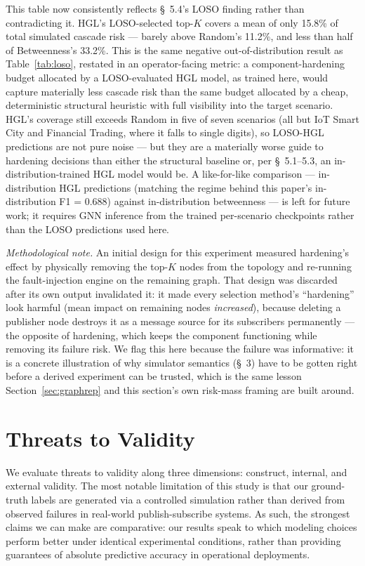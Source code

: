 \documentclass[review]{elsarticle}
\begin{document}
This table now consistently reflects \S~5.4's LOSO finding rather than contradicting it. HGL's
LOSO-selected top-$K$ covers a mean of only 15.8\% of total simulated cascade risk --- barely above
Random's 11.2\%, and less than half of Betweenness's 33.2\%. This is the same negative
out-of-distribution result as Table~\ref{tab:loso}, restated in an operator-facing metric: a
component-hardening budget allocated by a LOSO-evaluated HGL model, as trained here, would capture
materially less cascade risk than the same budget allocated by a cheap, deterministic structural
heuristic with full visibility into the target scenario. HGL's coverage still exceeds Random in
five of seven scenarios (all but IoT Smart City and Financial Trading, where it falls to single
digits), so LOSO-HGL predictions are not pure noise --- but they are a materially worse guide to
hardening decisions than either the structural baseline or, per \S~5.1--5.3, an
in-distribution-trained HGL model would be. A like-for-like comparison --- in-distribution HGL
predictions (matching the regime behind this paper's in-distribution F1 = 0.688) against
in-distribution betweenness --- is left for future work; it requires GNN inference from the trained
per-scenario checkpoints rather than the LOSO predictions used here.

\emph{Methodological note.} An initial design for this experiment measured hardening's effect by
physically removing the top-$K$ nodes from the topology and re-running the fault-injection engine
on the remaining graph. That design was discarded after its own output invalidated it: it made
every selection method's ``hardening'' look harmful (mean impact on remaining nodes
\emph{increased}), because deleting a publisher node destroys it as a message source for its
subscribers permanently --- the opposite of hardening, which keeps the component functioning while
removing its failure risk. We flag this here because the failure was informative: it is a concrete
illustration of why simulator semantics (\S~3) have to be gotten right before a derived experiment
can be trusted, which is the same lesson Section~\ref{sec:graphrep} and this section's own
risk-mass framing are built around.

\section{Threats to Validity}

We evaluate threats to validity along three dimensions: construct, internal, and external
validity. The most notable limitation of this study is that our ground-truth labels are generated
via a controlled simulation rather than derived from observed failures in real-world
publish-subscribe systems. As such, the strongest claims we can make are comparative: our results
speak to which modeling choices perform better under identical experimental conditions, rather
than providing guarantees of absolute predictive accuracy in operational deployments.
\end{document}
